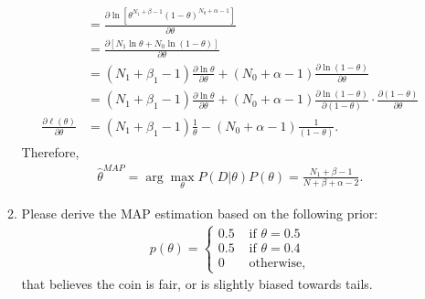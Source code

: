 \documentclass[10pt]{article}
\begin{document}
\begin{enumerate}[1.]
\begin{enumerate}
{\begin{align*}
\begin{aligned}
                                                                          & =\frac{\partial \ln \left[\theta^{N_1+\beta-1}(1-\theta)^{N_0+\alpha-1}\right]}{\partial \theta}                                                                                 \\
                                                                          & =\frac{\partial\left[N_1 \ln \theta+N_0 \ln (1-\theta)\right]}{\partial \theta}                                                                                                  \\
                                                                          & =(N_1+\beta_1 -1) \frac{\partial \ln \theta}{\partial \theta}+(N_0+\alpha-1) \frac{\partial \ln (1-\theta)}{\partial \theta}                                                     \\
                                                                          & =(N_1+\beta_1 -1) \frac{\partial \ln \theta}{\partial \theta}+(N_0+\alpha-1) \frac{\partial \ln (1-\theta)}{\partial(1-\theta)} \cdot \frac{\partial(1-\theta)}{\partial \theta} \\
                            \frac{\partial \ell(\theta)}{\partial \theta} & =(N_1+\beta_1-1)  \frac{1}{\theta}-(N_0+\alpha-1)  \frac{1}{(1-\theta)}.
                        \end{aligned}
                    \end{align*}
                    Therefore,
                    \begin{align*}
                        \hat{\theta}^{M A P}=\arg \max _{\theta} P(D | \theta) P(\theta)=\frac{N_1+\beta-1}{N+\beta+\alpha-2}.
                    \end{align*}
                    }
              \item Please derive the MAP estimation based on the following prior:
                    \begin{align*}
                        p(\theta)=\left\{\begin{array}{ll}
                            0.5 & \text { if } \theta=0.5 \\
                            0.5 & \text { if } \theta=0.4 \\
                            0   & \text { otherwise,}
                        \end{array}\right.
                    \end{align*}
                    that believes the coin is fair, or is slightly biased towards tails. ~ \\

\end{enumerate}
\end{enumerate}
\end{document}
